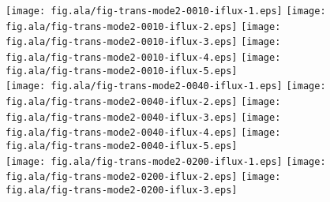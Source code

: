 \documentclass[a4paper,preprint,unsortedaddress,onecolumn]{revtex4-1}
\begin{document}
\begin{figure}
  \centering
  \texttt{[image: fig.ala/fig-trans-mode2-0010-iflux-1.eps]}
  \texttt{[image: fig.ala/fig-trans-mode2-0010-iflux-2.eps]}
  \texttt{[image: fig.ala/fig-trans-mode2-0010-iflux-3.eps]}
  \texttt{[image: fig.ala/fig-trans-mode2-0010-iflux-4.eps]}
  \texttt{[image: fig.ala/fig-trans-mode2-0010-iflux-5.eps]}\\
  \texttt{[image: fig.ala/fig-trans-mode2-0040-iflux-1.eps]}
  \texttt{[image: fig.ala/fig-trans-mode2-0040-iflux-2.eps]}
  \texttt{[image: fig.ala/fig-trans-mode2-0040-iflux-3.eps]}
  \texttt{[image: fig.ala/fig-trans-mode2-0040-iflux-4.eps]}
  \texttt{[image: fig.ala/fig-trans-mode2-0040-iflux-5.eps]}\\
  \texttt{[image: fig.ala/fig-trans-mode2-0200-iflux-1.eps]}
  \texttt{[image: fig.ala/fig-trans-mode2-0200-iflux-2.eps]}
  \texttt{[image: fig.ala/fig-trans-mode2-0200-iflux-3.eps]}

\end{figure}
\end{document}
